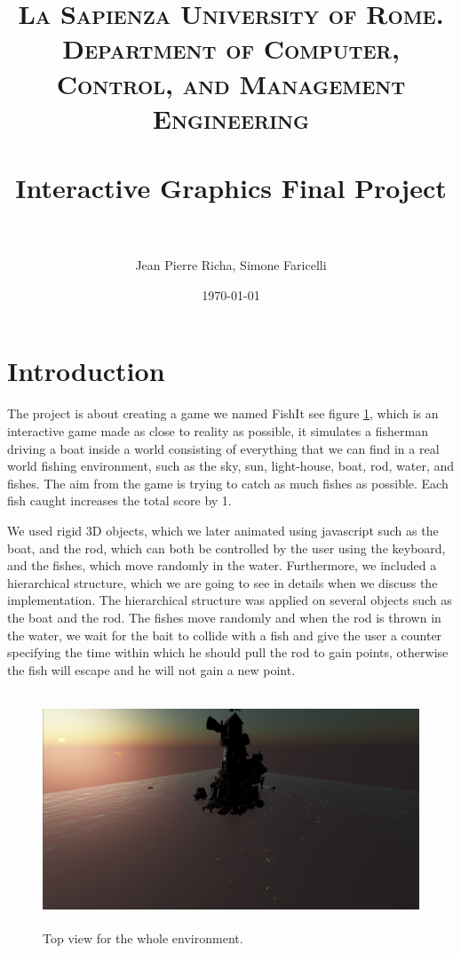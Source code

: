 \documentclass[paper=a4, fontsize=11pt]{scrartcl} %
\title{	
\normalfont \normalsize 
\textsc{La Sapienza University of Rome. Department of Computer, Control, and Management Engineering} \\ [25pt] %
\horrule{0.5pt} \\[0.4cm] %
\huge Interactive Graphics Final Project \\ %
\horrule{2pt} \\[0.5cm] %
}
\author{Jean Pierre Richa, Simone Faricelli} %
\date{\normalsize\today} %
\numberwithin{equation}{section} %
\numberwithin{figure}{section} %
\numberwithin{table}{section} %
\begin{document}
\maketitle %
\section{Introduction}

The project is about creating a game we named FishIt see figure \ref{world}, which is an interactive game made as close to reality as possible, it simulates a fisherman driving a boat inside a world consisting of everything that we can find in a real world fishing environment, such as the sky, sun, light-house, boat, rod, water, and fishes. The aim from the game is trying to catch as much fishes as possible. Each fish caught increases the total score by 1. \par We used rigid 3D objects, which we later animated using javascript such as the boat, and the rod, which can both be controlled by the user using the keyboard, and the fishes, which move randomly in the water. Furthermore, we included a hierarchical structure, which we are going to see in details when we discuss the implementation. The hierarchical structure was applied on several objects such as the boat and the rod. The fishes move randomly and when the rod is thrown in the water, we wait for the bait to collide with a fish and give the user a counter specifying the time within which he should pull the rod to gain points, otherwise the fish will escape and he will not gain a new point.

\begin{figure}
\centering
\includegraphics[width=15cm, height=7cm]{images/world.png}
\caption{Top view for the whole environment.}
\label{world}
\end{figure}
\end{document}
